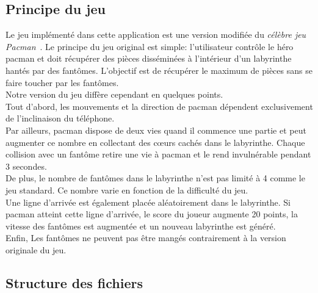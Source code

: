 \documentclass{article}
\begin{document}
\subsection{Principe du jeu}
Le jeu implémenté dans cette application est une version modifiée du \textit{célèbre jeu Pacman}~\cite{pacmanDoc}.
Le principe du jeu original est simple: l'utilisateur contrôle le héro pacman et doit récupérer des pièces disséminées à l'intérieur d'un labyrinthe hantés par des fantômes.
L'objectif est de récupérer le maximum de pièces sans se faire toucher par les fantômes.\\

Notre version du jeu diffère cependant en quelques points.
\\Tout d'abord, les mouvements et la direction de pacman dépendent exclusivement de l'inclinaison du téléphone.
\\Par ailleurs, pacman dispose de deux vies quand il commence une partie et peut augmenter ce nombre en collectant des cœurs cachés dans le labyrinthe.
Chaque collision avec un fantôme retire une vie à pacman et le rend invulnérable pendant 3 secondes.
\\De plus, le nombre de fantômes dans le labyrinthe n'est pas limité à 4 comme le jeu standard. 
Ce nombre varie en fonction de la difficulté du jeu.
\\Une ligne d'arrivée est également placée aléatoirement dans le labyrinthe. 
Si pacman atteint cette ligne d'arrivée, le score du joueur augmente 20 points, la vitesse des fantômes est augmentée et un nouveau labyrinthe est généré.
\\Enfin, Les fantômes ne peuvent pas être mangés contrairement à la version originale du jeu.

\subsection{Structure des fichiers}
\end{document}
